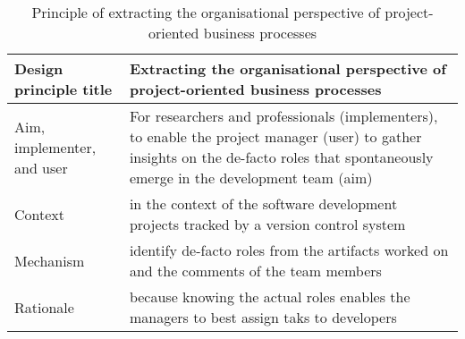 \begin{table}[]
	\centering
	\caption{Principle of extracting the organisational perspective of project-oriented business processes}
	\label{tab:orga-principle}
	\begin{tabular}{@{}lp{8cm}@{}}
		\toprule
		\textbf{Design principle title} & \textbf{Extracting the organisational perspective of project-oriented business processes} \\ \midrule
		Aim, implementer, and user &
		For researchers and professionals (implementers), to enable the project manager (user) to gather insights on the de-facto roles that spontaneously emerge in the development team (aim) \\
		Context                         & in the context of the software development projects tracked by a version control system   \\
		Mechanism                       & identify de-facto roles from the artifacts worked on and the comments of the team members \\
		Rationale                       & because knowing the actual roles enables the managers to best assign taks to developers   \\ \bottomrule
	\end{tabular}
\end{table}